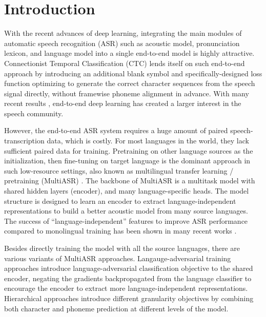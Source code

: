 \section{Introduction}
\label{sec:intro}

With the recent advances of deep learning, integrating the main modules of automatic speech recognition (ASR) such as acoustic model, pronunciation lexicon, and language model into a single end-to-end model is highly attractive. Connectionist Temporal Classification (CTC) \cite{graves2006connectionist} lends itself on such end-to-end approach by introducing an additional blank symbol and specifically-designed loss function optimizing to generate the correct character sequences from the speech signal directly, without framewise phoneme alignment in advance. With many recent results \cite{hannun2014deep, amodei2016deep, collobert2016wav2letter}, end-to-end deep learning has created a larger interest in the speech community.

However, the end-to-end ASR system requires a huge amount of paired speech-transcription data, which is costly. 
For most languages in the world, they lack sufficient paired data for training. 
Pretraining on other language sources as the initialization, then fine-tuning on target language is the dominant approach in such low-resource settings, also known as multilingual transfer learning / pretraining (MultiASR) \cite{vu2014multilingual, tong2017investigation}. 
The backbone of MultiASR is a multitask model with shared hidden layers (encoder), and many language-specific heads. 
The model structure is designed to learn an encoder to extract language-independent representations to build a better acoustic model from many source languages. 
The success of ``language-independent'' features to improve ASR performance compared to monolingual training has been shown in many recent works \cite{cho2018multilingual, dalmia2018sequence}.



Besides directly training the model with all the source languages, there are various variants of MultiASR approaches. 
Langauge-adversarial training approaches \cite{Yi2018AdversarialMT, adams2019massively} introduce language-adversarial classification objective to the shared encoder, negating the gradients backpropagated from the language classifier to encourage the encoder to extract more language-independent representations. 
Hierarchical approaches \cite{Sanabria2018HierarchicalMT} introduce different granularity objectives by combining both character and phoneme prediction at different levels of the model.

